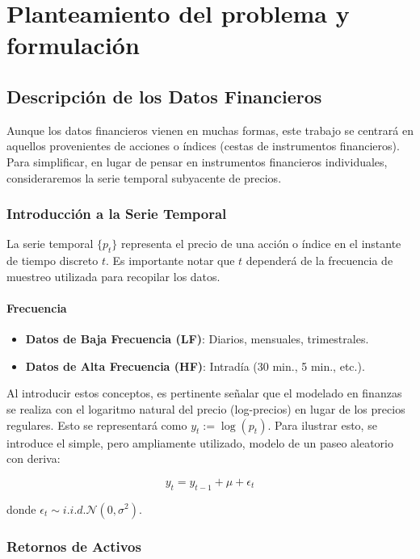 \documentclass[a4paper,12pt]{report}
\begin{document}
\chapter{Planteamiento del problema y formulación}
\section{Descripción de los Datos Financieros}

Aunque los datos financieros vienen en muchas formas, este trabajo se centrará en aquellos provenientes de acciones o índices 
(cestas de instrumentos financieros). Para simplificar, en lugar de pensar en instrumentos financieros individuales, consideraremos 
la serie temporal subyacente de precios.

\subsection{Introducción a la Serie Temporal}

La serie temporal $\{p_t\}$ representa el precio de una acción o índice en el instante de tiempo discreto $t$. Es importante 
notar que $t$ dependerá de la frecuencia de muestreo utilizada para recopilar los datos.

\subsubsection{Frecuencia}

\begin{itemize}
    \item \textbf{Datos de Baja Frecuencia (LF)}: Diarios, mensuales, trimestrales.
    \item \textbf{Datos de Alta Frecuencia (HF)}: Intradía (30 min., 5 min., etc.).
\end{itemize}

Al introducir estos conceptos, es pertinente señalar que el modelado en finanzas se realiza con el logaritmo natural del precio 
(log-precios) en lugar de los precios regulares. Esto se representará como $y_t := \log(p_t)$. Para ilustrar esto, se 
introduce el simple, pero ampliamente utilizado, modelo de un paseo aleatorio con deriva:

\[
y_t = y_{t-1} + \mu + \epsilon_t
\]

donde $\epsilon_t \sim i.i.d. \mathcal{N}(0, \sigma^2)$.

\subsection{Retornos de Activos}
\end{document}
